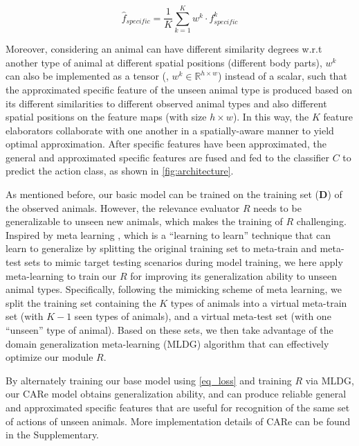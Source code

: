 \documentclass[10pt,twocolumn,letterpaper]{article}
\begin{document}
    \vspace{-0.3cm}
    \begin{equation} \label{eq_moe}
    {\hat f}_{specific} = \frac{1}{K}\sum_{k=1}^{K} w^k   \cdot f^k_{specific}
    \end{equation}
    
    \vspace{-3mm}
    
    Moreover, considering an animal can have different similarity degrees w.r.t another type of animal at different spatial positions (different body parts), $w^k$ can also be implemented as a tensor (\ie, $w^k \in \mathbb{R}^{h \times w}$) instead of a scalar, such that the approximated specific feature of the unseen animal type is produced based on its different similarities to different observed animal types and also different spatial positions on the feature maps (with size $h \times w$). In this way, the $K$ feature elaborators collaborate with one another in a spatially-aware manner to yield optimal approximation. After specific features have been approximated, the general and approximated specific features are fused and fed to the classifier $C$ to predict the action class, as shown in \cref{fig:architecture}. 
    
    
    As mentioned before, our basic model can be trained on the training set ($\textbf{D}$) of the observed animals. However, the relevance evaluator $R$ needs to be generalizable to unseen new animals,  
    which makes the training of $R$ challenging. 
    Inspired by meta learning \cite{dai2021generalizable, li2018learning,finn2017model, guo2020learning}, which is a ``learning to learn'' technique that can learn to generalize by splitting the original training set to meta-train and meta-test sets to mimic target testing scenarios during model training, we here apply meta-learning to train our $R$ for improving its generalization ability to unseen animal types.  
    Specifically, following the mimicking scheme of meta learning, 
    we split the training set containing the $K$ types of animals into a virtual meta-train set (with $K-1$ seen types of animals), and a virtual meta-test set (with one ``unseen'' type of animal). Based on these sets, we then take advantage of the domain generalization meta-learning (MLDG) algorithm \cite{li2018learning} that can effectively optimize our module $R$.
    
    By alternately training our base model using \cref{eq_loss} and training $R$ via MLDG, our CARe model obtains generalization ability, and can produce reliable general and approximated specific features that are useful for recognition of the same set of actions of unseen animals.  
    More implementation details of CARe can be found in the Supplementary.
    
\end{document}
